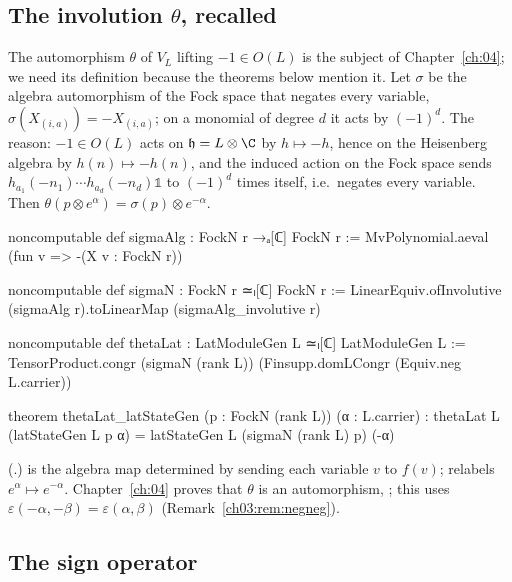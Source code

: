 \subsection{The involution \texorpdfstring{$\theta$}{theta}, recalled}

The automorphism $\theta$ of $V_L$ lifting $-1\in O(L)$ is the subject of Chapter~\ref{ch:04}; we
need its definition because the theorems below mention it. Let $\sigma$ be the algebra
automorphism of the Fock space that negates every variable, $\sigma(X_{(i,a)})=-X_{(i,a)}$; on a
monomial of degree $d$ it acts by $(-1)^d$. The reason: $-1\in O(L)$ acts on
$\mathfrak h=L\otimes\C$ by $h\mapsto-h$, hence on the Heisenberg algebra by $h(n)\mapsto-h(n)$,
and the induced action on the Fock space sends $h_{a_1}(-n_1)\cdots h_{a_d}(-n_d)\mathbb1$ to
$(-1)^d$ times itself, i.e.\ negates every variable. Then
$\theta(p\otimes e^\alpha)=\sigma(p)\otimes e^{-\alpha}$.
\begin{leancode}
noncomputable def sigmaAlg : FockN r →ₐ[ℂ] FockN r := MvPolynomial.aeval (fun v => -(X v : FockN r))

noncomputable def sigmaN : FockN r ≃ₗ[ℂ] FockN r :=
  LinearEquiv.ofInvolutive (sigmaAlg r).toLinearMap (sigmaAlg_involutive r)

noncomputable def thetaLat : LatModuleGen L ≃ₗ[ℂ] LatModuleGen L :=
  TensorProduct.congr (sigmaN (rank L)) (Finsupp.domLCongr (Equiv.neg L.carrier))

theorem thetaLat_latStateGen (p : FockN (rank L)) (α : L.carrier) :
    thetaLat L (latStateGen L p α) = latStateGen L (sigmaN (rank L) p) (-α)
\end{leancode}
(.)  is the algebra map determined
by sending each variable $v$ to $f(v)$;  relabels
$e^\alpha\mapsto e^{-\alpha}$. Chapter~\ref{ch:04} proves that $\theta$ is an automorphism,
; this uses $\varepsilon(-\alpha,-\beta)=
\varepsilon(\alpha,\beta)$ (Remark~\ref{ch03:rem:negneg}).

\subsection{The sign operator}

